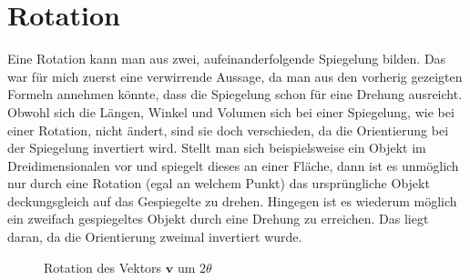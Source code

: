 %
%
%
\section{Rotation}

Eine Rotation kann man aus zwei, aufeinanderfolgende Spiegelung bilden. Das war für mich zuerst eine verwirrende Aussage, da man aus den vorherig gezeigten Formeln annehmen könnte, dass die Spiegelung schon für eine Drehung ausreicht. Obwohl sich die Längen, Winkel und Volumen sich bei einer Spiegelung, wie bei einer Rotation, nicht ändert, sind sie doch verschieden, da die Orientierung bei der Spiegelung invertiert wird. Stellt man sich beispielsweise ein Objekt im Dreidimensionalen vor und spiegelt dieses an einer Fläche, dann ist es unmöglich nur durch eine Rotation (egal an welchem Punkt) das ursprüngliche Objekt deckungsgleich auf das Gespiegelte zu drehen. Hingegen ist es wiederum möglich ein zweifach gespiegeltes Objekt durch eine Drehung zu erreichen. Das liegt daran, da die Orientierung zweimal invertiert wurde.
\begin{figure}
	\centering
	\caption{Rotation des Vektors $\textbf{v}$ um $2\theta$}
	\label{BildRotation}
\end{figure}

